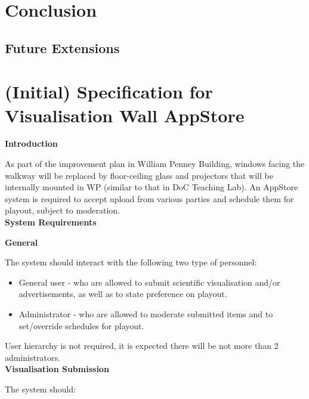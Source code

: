 \documentclass[a4paper, titlepage]{article}
\begin{document}
\newpage
\section{Conclusion}

\subsection{Future Extensions}



\newpage
\appendix

\section{(Initial) Specification for Visualisation Wall AppStore}

\textbf{\Large Introduction}

As part of the improvement plan in William Penney Building, windows facing the walkway will be replaced by floor-ceiling glass and projectors that will be internally mounted in WP (similar to that in DoC Teaching Lab). An AppStore system is required to accept upload from various parties and schedule them for playout, subject to moderation.\\

\textbf{\Large System Requirements} \vspace{5pt}

\textbf{\large General}

The system should interact with the following two type of personnel:

\begin{itemize}
  \item General user - who are allowed to submit scientific visualisation and/or advertisements, as well as to state preference on playout.
  \item Administrator - who are allowed to moderate submitted items and to set/override schedules for playout.
\end{itemize}

User hierarchy is not required, it is expected there will be not more than 2 administrators.\\

\textbf{\large Visualisation Submission}

The system should:
\end{document}
